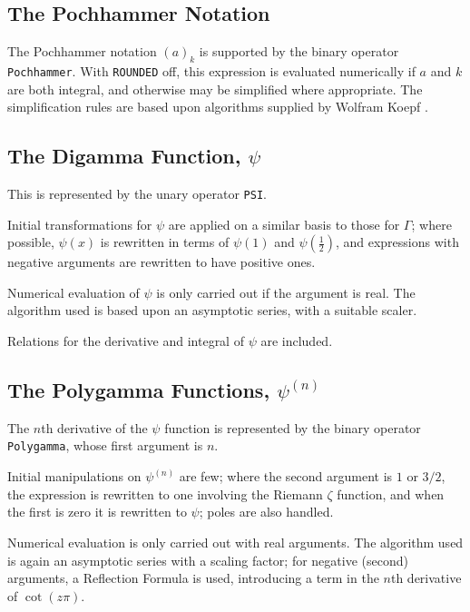 \documentclass[11pt]{article}
\begin{document}
\subsection{The Pochhammer Notation}

The Pochhammer notation $(a)_k$ is supported by the binary operator {\tt
Pochhammer}.  With {\tt ROUNDED} off, this expression is evaluated
numerically if $a$ and $k$ are both integral, and otherwise may be
simplified where appropriate.  The simplification rules are based upon
algorithms supplied by Wolfram Koepf \cite{Koepf:92}.



\subsection{The Digamma Function, $\psi$}

This is represented by the unary operator {\tt PSI}.

Initial transformations for $\psi$ are applied on a similar basis to
those for $\Gamma$; where possible, $\psi(x)$ is rewritten in
terms of $\psi(1)$ and $\psi(\frac{1}{2})$, and expressions with negative
arguments are rewritten to have positive ones.

Numerical evaluation of $\psi$ is only carried out if the argument is
real. The algorithm used is based upon an asymptotic series, with a
suitable scaler.

Relations for the derivative and integral of $\psi$ are included.


\subsection{The Polygamma Functions, $\psi^{(n)}$}

The $n$th derivative of the $\psi$ function is represented by the
binary operator {\tt Polygamma}, whose first argument is $n$.

Initial manipulations on $\psi^{(n)}$ are few; where the second argument
is $1$ or $3/2$, the expression is rewritten to one involving the
Riemann $\zeta$ function, and when the first is zero it is rewritten to
$\psi$; poles are also handled.

Numerical evaluation is only carried out with real arguments. The
algorithm used is again an asymptotic series with a scaling factor; for
negative (second) arguments, a Reflection Formula is used, introducing a
term in the $n$th derivative of $\cot(z\pi)$.
\end{document}

